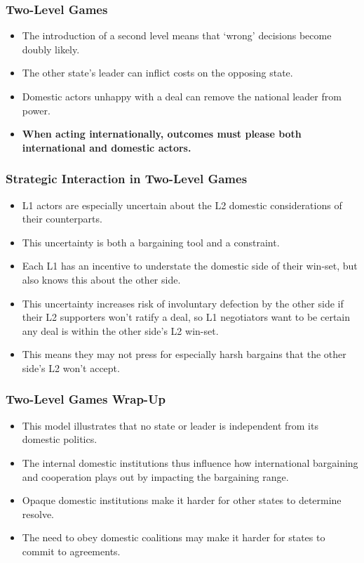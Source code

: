 \documentclass[handout]{beamer}
\begin{document}
\begin{frame} 
	\frametitle{\LARGE{Two-Level Games}}
		\begin{itemize}
			\item The introduction of a second level means that `wrong' decisions become doubly likely. \pause
			\item The other state's leader can inflict costs on the opposing state. \pause
			\item Domestic actors unhappy with a deal can remove the national leader from power. \pause
			\item \textbf{When acting internationally, outcomes must please both international and domestic actors.}
		\end{itemize}
\end{frame}

\begin{frame} 
	\frametitle{\LARGE{Strategic Interaction in Two-Level Games}}
	\begin{itemize}
		\item L1 actors are especially uncertain about the L2 domestic considerations of their counterparts. \pause
		\item This uncertainty is both a bargaining tool and a constraint. \pause
		\item Each L1 has an incentive to understate the domestic side of their win-set, but also knows this about the other side. \pause
		\item This uncertainty increases risk of involuntary defection by the other side if their L2 supporters won't ratify a deal, so L1 negotiators want to be certain any deal is within the other side's L2 win-set. \pause
		\item This means they may not press for especially harsh bargains that the other side's L2 won't accept.
	\end{itemize}
\end{frame}

\begin{frame} 
	\frametitle{\LARGE{Two-Level Games Wrap-Up}}
	\begin{itemize}
		\item This model illustrates that no state or leader is independent from its domestic politics.
		\item The internal domestic institutions thus influence how international bargaining and cooperation plays out by impacting the bargaining range. \pause
		\item Opaque domestic institutions make it harder for other states to determine resolve.  \pause 
		\item The need to obey domestic coalitions may make it harder for states to commit to agreements.
	\end{itemize}
\end{frame}
\end{document}
